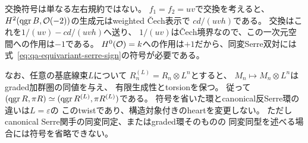 \begin{remark}[交換符号の検出と次数線束twist]
\label{rem:qa-antiserre-sign-test}
交換符号は単なる左右規約ではない。
$f_1=f_2=uv$で交換を考えると、
$H^2(\operatorname{qgr} B,\mathcal O(-2))$の生成元はweighted \v{C}ech表示で
$cd/(uvh)$である。
交換はこれを$1/(uv)-cd/(uvh)$へ送り、
$1/(uv)$は\v{C}ech境界なので、この一次元空間への作用は$-1$である。
$H^0(\mathcal O)=k$への作用は$+1$だから、同変Serre双対には
式~\eqref{eq:qa-equivariant-serre-sign}の符号が必要である。

なお、任意の基底線束$L$について
$R^{(L)}_n=R_n\otimes L^n$とすると、
$M_n\mapsto M_n\otimes L^n$はgraded加群圏の同値を与え、
有限生成性とtorsionを保つ。
従って$(\operatorname{qgr} R,\pi R)\simeq
(\operatorname{qgr} R^{(L)},\pi R^{(L)})$である。
符号を省いた環とcanonical反Serre環の違いは$L=\varepsilon$の
このtwistであり、構造対象付きのheartを変更しない。
ただしcanonical Serre関手の同変同定、またはgraded環そのものの
同変同型を述べる場合には符号を省略できない。
\end{remark}

